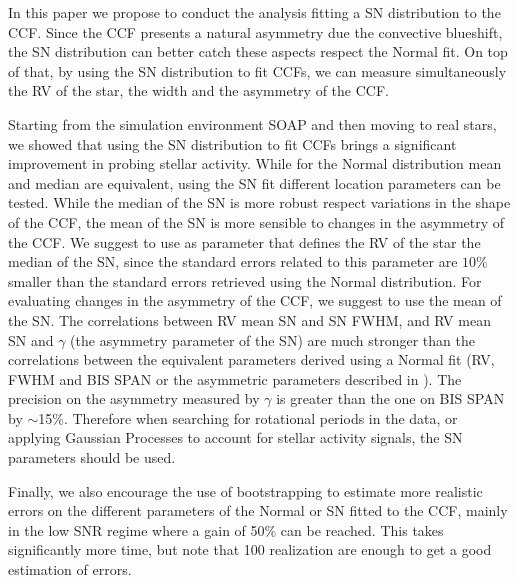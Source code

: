 \documentclass[11pt, oneside]{article}
\begin{document}
In this paper we propose to conduct the analysis fitting a SN distribution to the CCF. Since the CCF presents a natural asymmetry due the convective blueshift, the SN distribution can better catch these aspects respect the Normal fit. On top of that, by using the SN distribution to fit CCFs, we can measure simultaneously the RV of the star, the width and the asymmetry of the CCF.

Starting from the simulation environment SOAP and then moving to real stars, we showed that using the SN distribution to fit CCFs brings a significant improvement in probing stellar activity. While for the Normal distribution mean and median are equivalent, using the SN fit different location parameters can be tested. While the median of the SN is more robust respect variations in the shape of the CCF, the mean of the SN is more sensible to changes in the asymmetry of the CCF. We suggest to use as parameter that defines the RV of the star the median of the SN, since the standard errors related to this parameter are $10\%$ smaller than the standard errors retrieved using the Normal distribution. For evaluating changes in the asymmetry of the CCF, we suggest to use the mean of the SN. The correlations between RV mean SN and SN FWHM, and RV mean SN and $\gamma$ (the asymmetry parameter of the SN) are much stronger than the correlations between the equivalent parameters derived using a Normal fit (RV, FWHM and BIS SPAN or the asymmetric parameters described in \citet{Figueira-2013}). The precision on the asymmetry measured by $\gamma$ is greater than the one on BIS SPAN by $\sim$15\%. Therefore when searching for rotational periods in the data, or applying Gaussian Processes to account for stellar activity signals, the SN parameters should be used.

Finally, we also encourage the use of bootstrapping to estimate more realistic errors on the different parameters of the Normal or SN fitted to the CCF, mainly in the low SNR regime where a gain of 50\% can be reached. This takes significantly more time, but note that 100 realization are enough to get a good estimation of errors.


\end{document}
